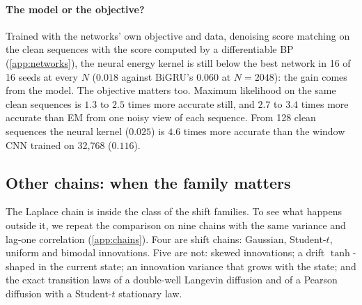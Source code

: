 \paragraph{The model or the objective?} Trained with the networks' own objective and data, denoising score matching
on the clean sequences with the score computed by a differentiable BP (\cref{app:networks}), the neural energy kernel
is still below the best network in 16 of 16 seeds at every $N$ ($0.018$ against BiGRU's $0.060$ at $N=2048$): the
gain comes from the model. The objective matters too. Maximum likelihood on the same clean sequences is $1.3$ to $2.5$
times more accurate still, and $2.7$ to $3.4$ times more accurate than EM from one noisy view of each sequence. From
128 clean sequences the neural kernel ($0.025$) is $4.6$ times more accurate than the window CNN trained on 32{,}768
($0.116$).

\subsection{Other chains: when the family matters}
\label{sec:chains}

\begin{table}[t]
  \caption{Relative score error at $N=2048$ on nine chains with unit variance and lag-one correlation $0.85$ (mean
  over 8 seeds). Linear: the best linear denoiser. Shift: the 25-parameter mixture. Neural: the energy kernel by EM
  from noisy sequences; neural$^{\ast}$: the same family by maximum likelihood on the clean sequences. Network: the
  best of a global MLP and a window CNN, and also of BiGRU and a U-Net for the chains marked $\dagger$.}
  \label{tab:chains}
  \centering
  \small
  \setlength{\tabcolsep}{3.5pt}
  
\end{table}

The Laplace chain is inside the class of the shift families. To see what happens outside it, we repeat the
comparison on nine chains with the same variance and lag-one correlation (\cref{app:chains}). Four are shift chains:
Gaussian, Student-$t$, uniform and bimodal innovations. Five are not: skewed innovations; a drift $\tanh$-shaped in
the current state; an innovation variance that grows with the state; and the exact transition laws of a double-well
Langevin diffusion and of a Pearson diffusion with a Student-$t$ stationary law.

